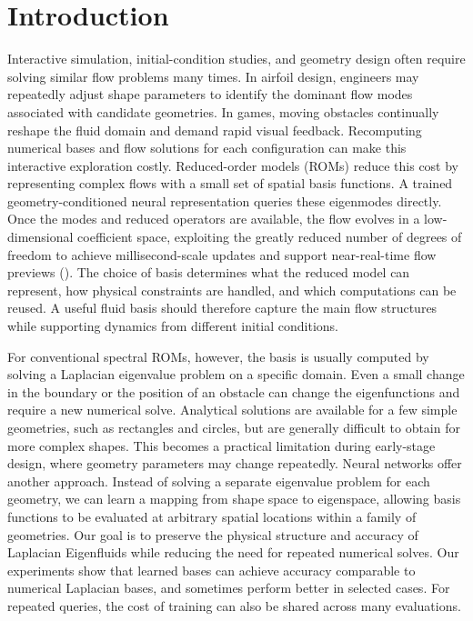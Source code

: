 \section{Introduction}
\begingroup
Interactive simulation, initial-condition studies, and geometry design often require solving similar flow problems many times. In airfoil design, engineers may repeatedly adjust shape parameters to identify the dominant flow modes associated with candidate geometries. In games, moving obstacles continually reshape the fluid domain and demand rapid visual feedback. Recomputing numerical bases and flow solutions for each configuration can make this interactive exploration costly. Reduced-order models (ROMs) reduce this cost by representing complex flows with a small set of spatial basis functions. A trained geometry-conditioned neural representation queries these eigenmodes directly. Once the modes and reduced operators are available, the flow evolves in a low-dimensional coefficient space, exploiting the greatly reduced number of degrees of freedom to achieve millisecond-scale updates and support near-real-time flow previews (). The choice of basis determines what the reduced model can represent, how physical constraints are handled, and which computations can be reused. A useful fluid basis should therefore capture the main flow structures while supporting dynamics from different initial conditions.

For conventional spectral ROMs, however, the basis is usually computed by solving a Laplacian eigenvalue problem on a specific domain. Even a small change in the boundary or the position of an obstacle can change the eigenfunctions and require a new numerical solve. Analytical solutions are available for a few simple geometries, such as rectangles and circles, but are generally difficult to obtain for more complex shapes. This becomes a practical limitation during early-stage design, where geometry parameters may change repeatedly. Neural networks offer another approach. Instead of solving a separate eigenvalue problem for each geometry, we can learn a mapping from shape space to eigenspace, allowing basis functions to be evaluated at arbitrary spatial locations within a family of geometries. Our goal is to preserve the physical structure and accuracy of Laplacian Eigenfluids while reducing the need for repeated numerical solves. Our experiments show that learned bases can achieve accuracy comparable to numerical Laplacian bases, and sometimes perform better in selected cases. For repeated queries, the cost of training can also be shared across many evaluations.

